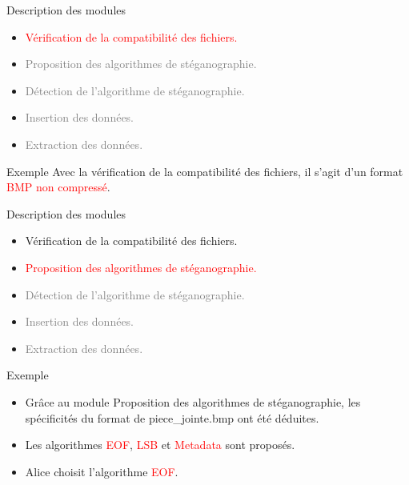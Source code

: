 \documentclass{beamer}
\begin{document}
  \begin{frame} %
	\begin{block}{Description des modules}
	\begin{itemize}
	[circle]
	\item \textcolor{red}{Vérification de la compatibilité des fichiers.}
	\item \textcolor{gray} {Proposition des algorithmes de stéganographie.}
	\item \textcolor{gray} {Détection de l'algorithme de stéganographie.}
	\item \textcolor{gray} {Insertion des données.}
	\item \textcolor{gray} {Extraction des données.}
	\end{itemize}
	\end{block}
	
	\begin{exampleblock}{Exemple} 
	Avec la vérification de la compatibilité des fichiers, il s'agit d'un 
	format \textcolor{red}{BMP non compressé}.  
	\end{exampleblock}
  \end{frame}
  
  \begin{frame} %
	\begin{block}{Description des modules}
	\begin{itemize}
	[circle]
	\item Vérification de la compatibilité des fichiers.
	\item \textcolor{red}{Proposition des algorithmes de stéganographie.}
	\item \textcolor{gray} {Détection de l'algorithme de stéganographie.}
	\item \textcolor{gray} {Insertion des données.}
	\item \textcolor{gray} {Extraction des données.}
	\end{itemize}
	\end{block}
	
	\begin{exampleblock}{Exemple} 
	\begin{itemize}
	[circle]
	\item Grâce au module Proposition des algorithmes de stéganographie, les 
	spécificités du format de piece\_jointe.bmp ont été déduites. 
	\item Les algorithmes \textcolor{red}{EOF}, \textcolor{red}{LSB} et 
	\textcolor{red}{Metadata} sont proposés. 
	\item Alice choisit l'algorithme \textcolor{red}{EOF}. 
	\end{itemize}
	
	\end{exampleblock}
  \end{frame}
  
\end{document}
